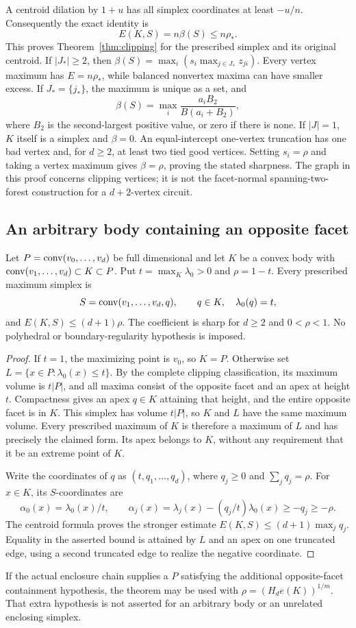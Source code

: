 A centroid dilation by $1+u$ has all simplex coordinates at least $-u/n$.
Consequently the exact identity is
\begin{equation}\label{eq:clip-exact-E}
 E(K,S)=n\beta(S)\le n\rho_*.
\end{equation}
This proves Theorem~\ref{thm:clipping} for the prescribed simplex and its
original centroid.
If $|J_*|\ge2$, then
$\beta(S)=\max_i(s_i\max_{j\in J_*}z_{ji})$. Every vertex maximum has
$E=n\rho_*$, while balanced nonvertex maxima can have smaller excess.
If $J_* =\{j_*\}$, the maximum is unique as a set, and
\[
 \beta(S)=\max_i\frac{a_iB_2}{B(a_i+B_2)},
\]
where $B_2$ is the second-largest positive value, or zero if there is none.
If $|J|=1$, $K$ itself is a simplex and $\beta=0$.
An equal-intercept one-vertex truncation has one bad vertex and, for
$d\ge2$, at least two tied good vertices. Setting $s_i=\rho$ and taking
a vertex maximum gives $\beta=\rho$, proving the stated sharpness.
The graph in this proof concerns clipping vertices; it is not the
facet-normal spanning-two-forest construction for a $d+2$-vertex circuit.

\subsection{An arbitrary body containing an opposite facet}
\begin{theorem}\label{thm:one-corner}
Let $P=\operatorname{conv}(v_0,\ldots,v_d)$ be full dimensional and let $K$ be a convex
body with $\operatorname{conv}(v_1,\ldots,v_d)\subset K\subset P$. Put
$t=\max_K\lambda_0>0$ and $\rho=1-t$. Every prescribed maximum simplex is
\[
 S=\operatorname{conv}(v_1,\ldots,v_d,q),\qquad q\in K,\quad\lambda_0(q)=t,
\]
and $E(K,S)\le(d+1)\rho$. The coefficient is sharp for $d\ge2$ and
$0<\rho<1$. No polyhedral or boundary-regularity hypothesis is imposed.
\end{theorem}
\begin{proof}
If $t=1$, the maximizing point is $v_0$, so $K=P$. Otherwise set
$L=\{x\in P:\lambda_0(x)\le t\}$. By the complete clipping classification,
its maximum volume is $t|P|$, and all maxima consist of the opposite facet
and an apex at height $t$. Compactness gives an apex $q\in K$ attaining
that height, and the entire opposite facet is in $K$. This simplex has
volume $t|P|$, so $K$ and $L$ have the same maximum volume. Every
prescribed maximum of $K$ is therefore a maximum of $L$ and has precisely
the claimed form. Its apex belongs to $K$, without any requirement that
it be an extreme point of $K$.

Write the coordinates of $q$ as $(t,q_1,\ldots,q_d)$, where
$q_j\ge0$ and $\sum_jq_j=\rho$. For $x\in K$, its $S$-coordinates are
\[
 \alpha_0(x)=\lambda_0(x)/t,\qquad
 \alpha_j(x)=\lambda_j(x)-(q_j/t)\lambda_0(x)\ge-q_j\ge-\rho.
\]
The centroid formula proves the stronger estimate
$E(K,S)\le(d+1)\max_jq_j$. Equality in the asserted bound is attained by
$L$ and an apex on one truncated edge, using a second truncated edge to
realize the negative coordinate.
\end{proof}
If the actual enclosure chain supplies a $P$ satisfying the additional
opposite-facet containment hypothesis, the theorem may be used with
$\rho=(H_de(K))^{1/m}$. That extra hypothesis is not asserted for an
arbitrary body or an unrelated enclosing simplex.
